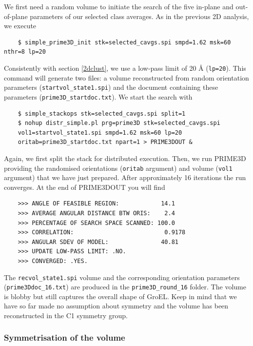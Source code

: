 \documentclass[a4paper,11pt]{article}
\begin{document}
We first need a random volume to initiate the search of the five in-plane and out-of-plane parameters of our selected class averages. As in the previous 2D analysis, we execute
\begin{verbatim}
    $ simple_prime3D_init stk=selected_cavgs.spi smpd=1.62 msk=60 nthr=8 lp=20
\end{verbatim}
Consistently with section \ref{2dclust}, we use a low-pass limit of 20 \AA{} (\texttt{lp=20}). This command will generate two files: a volume reconstructed from random orientation parameters (\texttt{startvol\_state1.spi}) and the document containing these parameters (\texttt{prime3D\_startdoc.txt}). We start the search with
\begin{verbatim}
    $ simple_stackops stk=selected_cavgs.spi split=1
    $ nohup distr_simple.pl prg=prime3D stk=selected_cavgs.spi 
    vol1=startvol_state1.spi smpd=1.62 msk=60 lp=20 
    oritab=prime3D_startdoc.txt npart=1 > PRIME3DOUT &
\end{verbatim}
Again, we first split the stack for distributed execution. Then, we run PRIME3D providing the randomised orientations (\texttt{oritab} argument) and volume (\texttt{vol1} argument) that we have just prepared. After approximately 16 iterations the run converges. At the end of PRIME3DOUT you will find
\begin{verbatim}
    >>> ANGLE OF FEASIBLE REGION:            14.1
    >>> AVERAGE ANGULAR DISTANCE BTW ORIS:    2.4 
    >>> PERCENTAGE OF SEARCH SPACE SCANNED: 100.0
    >>> CORRELATION:                          0.9178
    >>> ANGULAR SDEV OF MODEL:               40.81
    >>> UPDATE LOW-PASS LIMIT: .NO.
    >>> CONVERGED: .YES.
\end{verbatim}
The \texttt{recvol\_state1.spi} volume and the corresponding orientation parameters (\texttt{prime3Ddoc\_16.txt}) are produced in the \texttt{prime3D\_round\_16} folder. The volume is blobby but still captures the overall shape of GroEL. Keep in mind that we have so far made no assumption about symmetry and the volume has been reconstructed in the C1 symmetry group.

\subsubsection{Symmetrisation of the volume}
\end{document}

